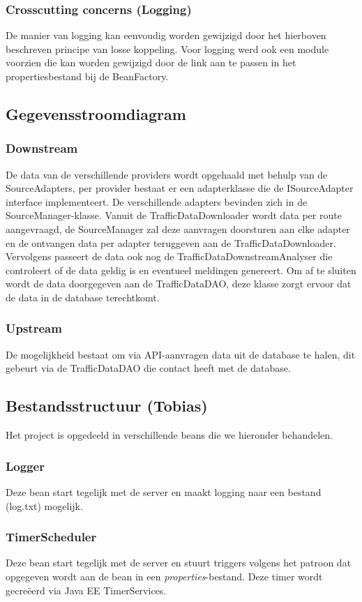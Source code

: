 \documentclass[ps,a4paper,oneside]{report}
\begin{document}
\subsubsection{Crosscutting concerns (Logging)}
De manier van logging kan eenvoudig worden gewijzigd door het hierboven beschreven principe van losse koppeling. Voor logging werd ook een module voorzien die kan worden gewijzigd door de link aan te passen in het propertiesbestand bij de BeanFactory.
\subsection{Gegevensstroomdiagram}
\subsubsection{Downstream}
De data van de verschillende providers wordt opgehaald met behulp van de SourceAdapters, per provider bestaat er een adapterklasse die de ISourceAdapter interface implementeert. De verschillende adapters bevinden zich in de \\SourceManager-klasse. Vanuit de TrafficDataDownloader wordt data per route aangevraagd, de SourceManager zal deze aanvragen doorsturen aan elke adapter en de ontvangen data per adapter teruggeven aan de TrafficDataDownloader. Vervolgens passeert de data ook nog de TrafficDataDownstreamAnalyser die controleert of de data geldig is en eventueel meldingen genereert. Om af te sluiten wordt de data doorgegeven aan de TrafficDataDAO, deze klasse zorgt ervoor dat de data in de database terechtkomt. 
\subsubsection{Upstream}
De mogelijkheid bestaat om via API-aanvragen data uit de database te halen, dit gebeurt via de TrafficDataDAO die contact heeft met de database.
\subsection{Bestandsstructuur (Tobias)}
Het project is opgedeeld in verschillende beans die we hieronder behandelen.
\subsubsection{Logger}
Deze bean start tegelijk met de server en maakt logging naar een bestand (log.txt) mogelijk.
\subsubsection{TimerScheduler}
Deze bean start tegelijk met de server en stuurt triggers volgens het patroon dat opgegeven wordt aan de bean in een \textit{properties}-bestand. Deze timer wordt gecre\"eerd via Java EE TimerServices.
\end{document}
